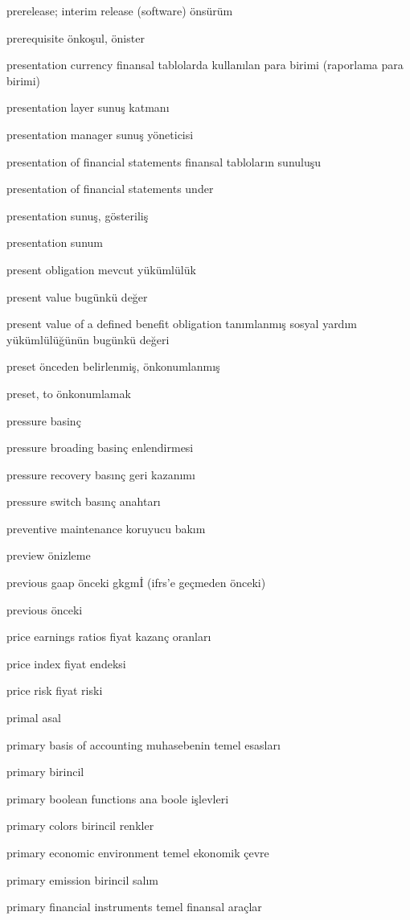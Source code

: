 \documentclass[12pt,fleqn]{article}\usepackage{../../common}
\begin{document}
prerelease; interim release (software) önsürüm

prerequisite önkoşul, önister

presentation currency finansal tablolarda kullanılan para birimi (raporlama para birimi)

presentation layer sunuş katmanı

presentation manager sunuş yöneticisi

presentation of financial statements finansal tabloların sunuluşu

presentation of financial statements under

presentation sunuş, gösteriliş

presentation sunum

present obligation mevcut yükümlülük

present value bugünkü değer

present value of a defined benefit obligation tanımlanmış sosyal yardım yükümlülüğünün bugünkü değeri

preset önceden belirlenmiş, önkonumlanmış

preset, to önkonumlamak

pressure basinç

pressure broading basinç enlendirmesi

pressure recovery basınç geri kazanımı

pressure switch basınç anahtarı

preventive maintenance koruyucu bakım

preview önizleme

previous gaap önceki gkgmİ (ifrs'e geçmeden önceki)

previous önceki

price earnings ratios fiyat kazanç oranları

price index fiyat endeksi

price risk fiyat riski

primal asal

primary basis of accounting muhasebenin temel esasları

primary birincil

primary boolean functions ana boole işlevleri

primary colors birincil renkler

primary economic environment temel ekonomik çevre

primary emission birincil salım

primary financial instruments temel finansal araçlar
\end{document}
